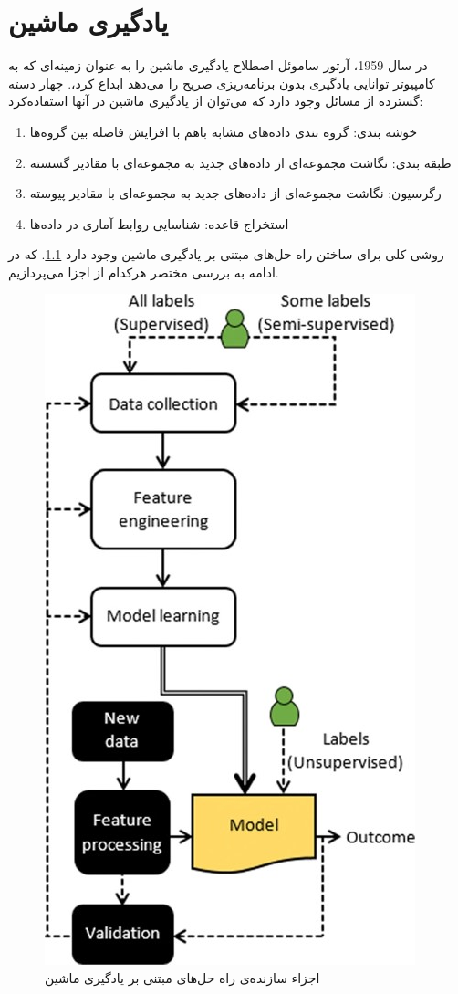 \chapter{یادگیری ماشین}
در سال 1959، آرتور ساموئل اصطلاح یادگیری ماشین را به عنوان زمینه‌ای که به کامپیوتر توانایی یادگیری بدون برنامه‌ریزی صریح را می‌دهد ابداع کرد،. چهار دسته گسترده از مسائل وجود دارد که می‌توان از یادگیری ماشین در آنها استفاده‌کرد:
\begin{enumerate}
    \item خوشه‌ بندی:
    گروه بندی داده‌های مشابه باهم با افزایش فاصله بین گروه‌ها 
    \item طبقه ‌بندی: نگاشت مجموعه‌ای از داده‌های جدید به مجموعه‌ای با مقادیر گسسته 
    \item رگرسیون: نگاشت مجموعه‌ای از داده‌های جدید به مجموعه‌ای با مقادیر پیوسته
    \item استخراج قاعده: شناسایی روابط آماری در داده‌ها 
\end{enumerate}

روشی کلی برای ساختن راه حل‌های مبتنی بر یادگیری ماشین وجود دارد \cref{fig.1}. که در ادامه به بررسی مختصر هرکدام از اجزا می‌پردازیم.

\begin{figure}[!h]
\centering\includegraphics[scale=.8]{./figures/Solution}
\caption{اجزاء سازنده‌ی راه حل‌های مبتنی بر یادگیری ماشین}\label{fig.1}
\end{figure}

